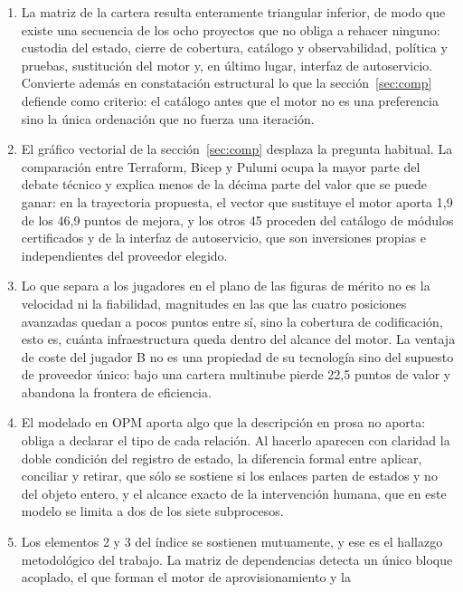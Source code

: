 \documentclass[11pt,letterpaper]{article}
\begin{document}
\begin{enumerate}
    cualquier capa intermedia. Tratarla como un endurecimiento posterior
    obliga a rehacer todo lo construido antes.
  \item La matriz de la cartera resulta enteramente triangular inferior, de
    modo que existe una secuencia de los ocho proyectos que no obliga a
    rehacer ninguno: custodia del estado, cierre de cobertura, catálogo y
    observabilidad, política y pruebas, sustitución del motor y, en último
    lugar, interfaz de autoservicio. Convierte además en constatación
    estructural lo que la sección~\ref{sec:comp} defiende como criterio: el
    catálogo antes que el motor no es una preferencia sino la única
    ordenación que no fuerza una iteración.
  \item El gráfico vectorial de la sección~\ref{sec:comp} desplaza la
    pregunta habitual.
    La comparación entre Terraform, Bicep y Pulumi ocupa la mayor parte del
    debate técnico y explica menos de la décima parte del valor que se puede
    ganar: en la trayectoria propuesta, el vector que sustituye el motor
    aporta 1,9 de los 46,9 puntos de mejora, y los otros 45 proceden del
    catálogo de módulos certificados y de la interfaz de autoservicio, que son
    inversiones propias e independientes del proveedor elegido.
  \item Lo que separa a los jugadores en el plano de las figuras de mérito no
    es la velocidad ni la fiabilidad, magnitudes en las que las cuatro
    posiciones avanzadas quedan a pocos puntos entre sí, sino la cobertura de
    codificación, esto es, cuánta infraestructura queda dentro del alcance del
    motor. La ventaja de coste del jugador B no es una propiedad de su
    tecnología sino del supuesto de proveedor único: bajo una cartera
    multinube pierde 22,5 puntos de valor y abandona la frontera de
    eficiencia.
  \item El modelado en OPM aporta algo que la descripción en prosa no aporta:
    obliga a declarar el tipo de cada relación. Al hacerlo aparecen con
    claridad la doble condición del registro de estado, la diferencia formal
    entre aplicar, conciliar y retirar, que sólo se sostiene si los enlaces
    parten de estados y no del objeto entero, y el alcance exacto de la
    intervención humana, que en este modelo se limita a dos de los siete
    subprocesos.
  \item Los elementos 2 y 3 del índice se sostienen mutuamente, y ese es el
    hallazgo metodológico del trabajo. La matriz de dependencias detecta un
    único bloque acoplado, el que forman el motor de aprovisionamiento y la

\end{enumerate}
\end{document}
